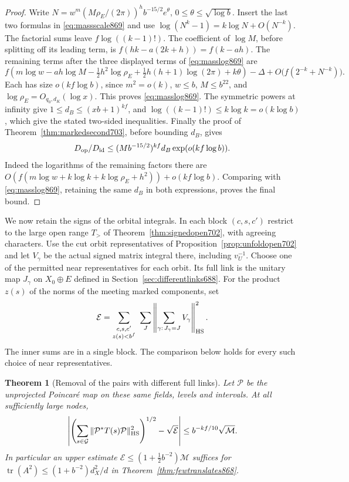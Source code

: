 \documentclass[a4paper,11pt]{article}
\newtheorem{theorem}[proposition]{Theorem}
\theoremstyle{definition}
\theoremstyle{remark}
\numberwithin{equation}{section}
\begin{document}
\begin{proof}
Write \(N=w^m(M\rho_E/(2\pi))^h b^{-15/2}e^\theta\),
\(0\le\theta\le\sqrt{\log b}\). Insert the last two formulas in
\eqref{eq:massscale869} and use
\(\log(N^k-1)=k\log N+O(N^{-k})\). The factorial sums leave
\(f\log((k-1)!)\). The coefficient of \(\log M\), before
splitting off its leading term, is \(f(hk-a(2k+h))=f(k-ah)\).
The remaining terms after the three displayed terms of
\eqref{eq:masslog869} are
\[
 f\left(m\log w-ah\log M-\tfrac12h^2\log\rho_E
       +\tfrac12 h(h+1)\log(2\pi)+k\theta\right)
       -\Delta+O\big(f(2^{-k}+N^{-k})\big).
\]
Each has size \(o(kf\log b)\), since \(m^2=o(k)\),
\(w\le b\), \(M\le b^{22}\), and \(\log\rho_E=O_{q_0,d_K}(\log x)\).
This proves \eqref{eq:masslog869}. The symmetric powers at infinity
give \(1\le d_B\le(xb+1)^{kf}\), and
\(\log((k-1)!)\le k\log k=o(k\log b)\), which give the stated
two-sided inequalities. Finally the proof of
Theorem~\ref{thm:markedsecond703}, before bounding \(d_B\), gives
\[
 D_{\rm op}/D_{\rm id}
 \le (M b^{-15/2})^{kf}d_B\exp(o(kf\log b)).
\]
Indeed the logarithms of the remaining factors there are
\(O(f(m\log w+k\log k+k\log\rho_E+h^2))+
o(kf\log b)\). Comparing with \eqref{eq:masslog869}, retaining
the same \(d_B\) in both expressions, proves the final bound.
\end{proof}

We now retain the signs of the orbital integrals. In each block
\((c,s,c')\) restrict to the large open range \(T_>\) of
Theorem~\ref{thm:signedopen702}, with agreeing characters.
Use the cut orbit representatives of
Proposition~\ref{prop:unfoldopen702} and let \(V_\gamma\) be
the actual signed matrix integral there, including \(v_U^{-1}\).
Choose one of the permitted near representatives for each orbit.
Its full link is the unitary map \(J_\gamma\) on \(X_0\oplus E\)
defined in Section~\ref{sec:differentlinks688}. For the product
\(z(s)\) of the norms of the meeting marked components, set
\begin{equation}
 \mathcal E=\sum_{\substack{c,s,c'\\z(s)<b^f}}
       \ \sum_J
       \left\|\sum_{\gamma:\,J_\gamma=J}V_\gamma\right\|_{\rm HS}^2 .
 \label{eq:linkenergy869}
\end{equation}
The inner sums are in a single block. The comparison below holds
for every such choice of near representatives.

\begin{theorem}[Removal of the pairs with different full links]
\leavevmode\label{thm:equallinks869}
Let \(\mathcal P\) be the unprojected Poincar\'e map on these same
fields, levels and intervals. At all sufficiently large nodes,
\[
 \left|
 \left(\sum_{s\in\mathcal G}\|\mathcal P^*T(s)\mathcal P\|_{\rm HS}^2
                         \right)^{1/2}-\sqrt{\mathcal E}\right|
       \le b^{-kf/10}\sqrt{\mathcal M}.
\]
In particular an upper estimate
\(\mathcal E\le(1+\tfrac12 b^{-2})\mathcal M\) suffices for
\(\operatorname{tr}(A^2)\le(1+b^{-2})d_X^2/d\) in
Theorem~\ref{thm:fewtranslates868}.
\end{theorem}
\end{document}
